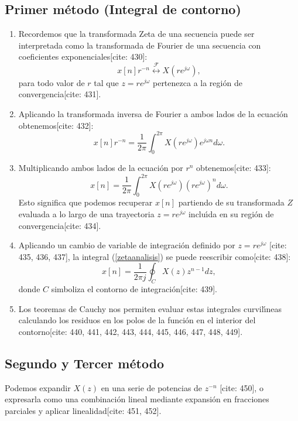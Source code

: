 \subsection{Primer m\'{e}todo (Integral de contorno)}
\begin{enumerate}
	\item Recordemos que la transformada Zeta de una secuencia puede ser interpretada como la transformada de Fourier de una secuencia con coeficientes exponenciales[cite: 430]:
	\begin{equation}
		x[n] r^{-n} \stackrel{\mathcal{F}}{\longleftrightarrow} X(r e^{j \omega}),
	\end{equation}
	para todo valor de $r$ tal que $z = r e^{j \omega}$ pertenezca a la regi\'{o}n de convergencia[cite: 431].
	\item Aplicando la transformada inversa de Fourier a ambos lados de la ecuaci\'{o}n obtenemos[cite: 432]:
	\begin{equation}
		x[n] r^{-n} = \frac{1}{2 \pi} \int^{2 \pi}_{0} X(r e^{j \omega}) e^{j \omega n} d \omega.
	\end{equation}
	\item Multiplicando ambos lados de la ecuaci\'{o}n por $r^{n}$ obtenemos[cite: 433]:
	\begin{equation} \label{zetaanalisis}
		x[n] = \frac{1}{2 \pi} \int^{2 \pi}_{0} X(r e^{j \omega}) (r e^{j \omega})^{n} d \omega.
	\end{equation}
	Esto significa que podemos recuperar $x[n]$ partiendo de su transformada $Z$ evaluada a lo largo de una trayectoria $z=r e^{j \omega}$ inclu\'{\i}da en su regi\'{o}n de convergencia[cite: 434].
	\item Aplicando un cambio de variable de integraci\'{o}n definido por $z = r e^{j \omega}$ [cite: 435, 436, 437], la integral (\ref{zetaanalisis}) se puede reescribir como[cite: 438]:
	\begin{equation}
		x[n] = \frac{1}{2 \pi j} \oint_{C} X(z) z^{n-1} dz,
	\end{equation}
	donde $C$ simboliza el contorno de integraci\'{o}n[cite: 439].
	\item Los teoremas de Cauchy nos permiten evaluar estas integrales curvil\'{\i}neas calculando los residuos en los polos de la función en el interior del contorno[cite: 440, 441, 442, 443, 444, 445, 446, 447, 448, 449].
\end{enumerate}

\subsection{Segundo y Tercer m\'{e}todo}
Podemos expandir $X(z)$ en una serie de potencias de $z^{-n}$ [cite: 450], o expresarla como una combinaci\'{o}n lineal mediante expansión en fracciones parciales y aplicar linealidad[cite: 451, 452].

